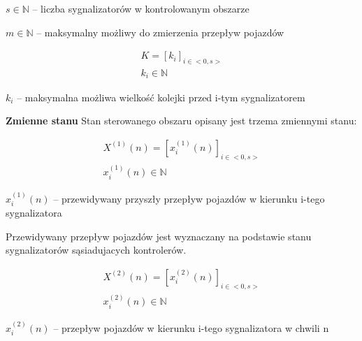\begin{math} s \in \mathbb{N} \end{math} \textrm{ -- liczba sygnalizatorów w kontrolowanym obszarze}

\begin{math} m \in \mathbb{N} \end{math} \textrm{ -- maksymalny możliwy do zmierzenia przepływ pojazdów}

\begin{equation}
	\begin{array}{c}
		K = \left[ k_{i} \right]_{i \in <0,s>}\\
		k_{i} \in \mathbb{N}
	\end{array}
\end{equation}

\begin{math} k_{i} \end{math} \textrm{ -- maksymalna możliwa wielkość kolejki przed i-tym sygnalizatorem}

\vspace{1.5cm}
\textbf{Zmienne stanu}
Stan sterowanego obszaru opisany jest trzema zmiennymi stanu:
\vspace{0.5cm}

\begin{equation}
	\begin{array}{c}
		X^{(1)} (n) = \left[ x^{(1)}_{i} (n) \right]_{i \in <0,s>}\\
		x^{(1)}_{i} (n) \in \mathbb{N}
	\end{array}
\end{equation}

\begin{math} x^{(1)}_{i} (n) \end{math} \textrm{ -- przewidywany przyszły przepływ pojazdów w kierunku i-tego sygnalizatora}

Przewidywany przepływ pojazdów jest wyznaczany na podstawie stanu sygnalizatorów sąsiadujacych kontrolerów.

\begin{equation}
	\begin{array}{c}
		X^{(2)} (n) = \left[ x^{(2)}_{i} (n) \right]_{i \in <0,s>}\\
		x^{(2)}_{i} (n) \in \mathbb{N}
	\end{array}
\end{equation}

\begin{math} x^{(2)}_{i} (n) \end{math} \textrm{ -- przepływ pojazdów w kierunku i-tego sygnalizatora w chwili n}

